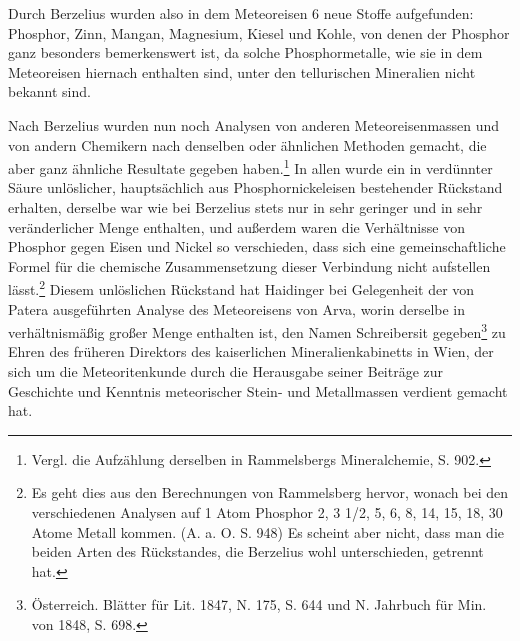 \documentclass[a4paper, 11pt, oneside]{article}
\begin{document}
Durch Berzelius wurden also in dem Meteoreisen 6 neue Stoffe aufgefunden: Phosphor, Zinn, Mangan, Magnesium, Kiesel und Kohle, von denen der Phosphor ganz besonders bemerkenswert ist, da solche Phosphormetalle, wie sie in dem Meteoreisen hiernach enthalten sind, unter den tellurischen Mineralien nicht bekannt sind.

Nach Berzelius wurden nun noch Analysen von anderen Meteoreisenmassen und von andern Chemikern nach denselben oder ähnlichen Methoden gemacht, die aber ganz ähnliche Resultate gegeben haben.\footnote{Vergl. die Aufzählung derselben in Rammelsbergs Mineralchemie, S. 902.} In allen wurde ein in verdünnter Säure unlöslicher, hauptsächlich aus Phosphornickeleisen bestehender Rückstand erhalten, derselbe war wie bei Berzelius stets nur in sehr geringer und in sehr veränderlicher Menge enthalten, und außerdem waren die Verhältnisse von Phosphor gegen Eisen und Nickel so verschieden, dass sich eine gemeinschaftliche Formel für die chemische Zusammensetzung dieser Verbindung nicht aufstellen lässt.\footnote{Es geht dies aus den Berechnungen von Rammelsberg hervor, wonach bei den verschiedenen Analysen auf 1 Atom Phosphor 2, 3 1/2, 5, 6, 8, 14, 15, 18, 30 Atome Metall kommen. (A. a. O. S. 948) Es scheint aber nicht, dass man die beiden Arten des Rückstandes, die Berzelius wohl unterschieden, getrennt hat.} Diesem unlöslichen Rückstand hat Haidinger bei Gelegenheit der von Patera ausgeführten Analyse des Meteoreisens von Arva, worin derselbe in verhältnismäßig großer Menge enthalten ist, den Namen Schreibersit gegeben\footnote{Österreich. Blätter für Lit. 1847, N. 175, S. 644 und N. Jahrbuch für Min. von 1848, S. 698.} zu Ehren des früheren Direktors des kaiserlichen Mineralienkabinetts in Wien, der sich um die Meteoritenkunde durch die Herausgabe seiner Beiträge zur Geschichte und Kenntnis meteorischer Stein- und Metallmassen verdient gemacht hat.
\end{document}
